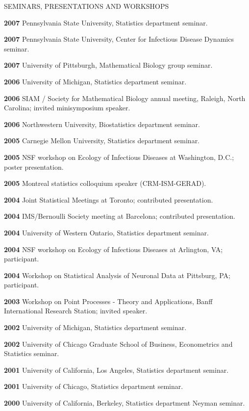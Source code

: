 \begin{mylist}{SEMINARS, PRESENTATIONS AND WORKSHOPS}
\item{\bf 2007 } Pennsylvania State University, Statistics department seminar.

\item{\bf 2007 } Pennsylvania State University, Center for Infectious Disease Dynamics seminar.

\item{\bf 2007 } University of Pittsburgh, Mathematical Biology group seminar.

\item{\bf 2006 }  University of Michigan,
  Statistics department seminar. 
\item{\bf 2006 }  SIAM / Society for Mathematical Biology annual meeting, Raleigh, North Carolina; invited minisymposium speaker.
\item{\bf 2006 }  Northwestern University, 
 Biostatistics department seminar.
\item{\bf 2005 }  Carnegie Mellon University, 
 Statistics department seminar.
\item{\bf 2005 }  NSF workshop on Ecology of
  Infectious Diseases at Washington, D.C.; poster presentation.
\item{\bf 2005 } Montreal statistics
  colloquium speaker (CRM-ISM-GERAD).
\item{\bf 2004 } Joint Statistical Meetings at
  Toronto; contributed presentation.
\item{\bf 2004 } IMS/Bernoulli Society meeting at Barcelona; contributed presentation.
\item{\bf 2004 } University of Western Ontario, 
 Statistics department seminar.
\item{\bf 2004 } NSF workshop on Ecology of
  Infectious Diseases at Arlington, VA; participant.
\item{\bf 2004 } Workshop on Statistical Analysis of
  Neuronal Data at Pittsburg, PA; participant.
\item{\bf 2003 }  Workshop on Point Processes - Theory and Applications,
  Banff International Research Station; invited speaker.
\item{\bf 2002 }  University of Michigan,
  Statistics department seminar. 
\item{\bf 2002 }  University of Chicago Graduate School of Business, Econometrics and Statistics seminar. 
\item{\bf 2001 } University of California, Los Angeles, Statistics department seminar. 
\item{\bf 2001 }  University of Chicago, Statistics department seminar.  
\item{\bf 2000 } University of California, Berkeley, Statistics department Neyman seminar.
\end{mylist}














